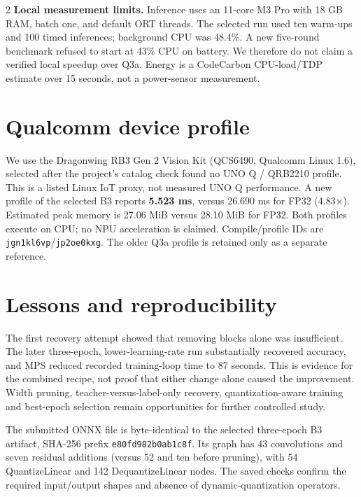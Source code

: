 \documentclass[10pt,letterpaper]{article}
\newcommand{\code}[1]{\texttt{\small #1}}
\begin{document}
\begin{multicols}{2}
\noindent\textbf{Local measurement limits.} Inference uses an 11-core M3 Pro with 18 GB RAM, batch one, and default ORT threads. The selected run used ten warm-ups and 100 timed inferences; background CPU was 48.4\%. A new five-round benchmark refused to start at 43\% CPU on battery. We therefore do not claim a verified local speedup over Q3a. Energy is a CodeCarbon CPU-load/TDP estimate over 15 seconds, not a power-sensor measurement.

\columnbreak
\section{Qualcomm device profile}
We use the Dragonwing RB3 Gen 2 Vision Kit (QCS6490, Qualcomm Linux 1.6), selected after the project's catalog check found no UNO Q / QRB2210 profile. This is a listed Linux IoT proxy, not measured UNO Q performance. A new profile of the selected B3 reports \textbf{5.523 ms}, versus 26.690 ms for FP32 (4.83$\times$). Estimated peak memory is 27.06 MiB versus 28.10 MiB for FP32. Both profiles execute on CPU; no NPU acceleration is claimed. Compile/profile IDs are \code{jgn1kl6vp}/\code{jp2oe0kxg}. The older Q3a profile is retained only as a separate reference.

\section{Lessons and reproducibility}
The first recovery attempt showed that removing blocks alone was insufficient. The later three-epoch, lower-learning-rate run substantially recovered accuracy, and MPS reduced recorded training-loop time to 87 seconds. This is evidence for the combined recipe, not proof that either change alone caused the improvement. Width pruning, teacher-versus-label-only recovery, quantization-aware training and best-epoch selection remain opportunities for further controlled study.

The submitted ONNX file is byte-identical to the selected three-epoch B3 artifact, SHA-256 prefix \code{e80fd982b0ab1c8f}. Its graph has 43 convolutions and seven residual additions (versus 52 and ten before pruning), with 54 QuantizeLinear and 142 DequantizeLinear nodes. The saved checks confirm the required input/output shapes and absence of dynamic-quantization operators.


\end{multicols}
\end{document}
